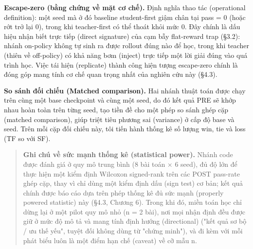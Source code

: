 \textbf{Escape-zero (bằng chứng về mặt cơ chế).} Định nghĩa thao tác (operational definition): một seed mà ở đó baseline student-first giậm chân tại pass = 0 (hoặc rớt trở lại 0), trong khi teacher-first có thể thoát khỏi mức 0. Đây chính là dấu hiệu nhận biết trực tiếp (direct signature) của cạm bẫy flat-reward trap (§3.2): nhánh on-policy không tự sinh ra được rollout đúng nào để học, trong khi teacher (thiên về off-policy) có khả năng bơm (inject) trực tiếp một lời giải đúng vào quá trình học. Việc tái hiện (replicate) thành công hiện tượng escape-zero chính là đóng góp mang tính cơ chế quan trọng nhất của nghiên cứu này (§4.3).

\textbf{So sánh đối chiếu (Matched comparison).} Hai nhánh thuật toán được chạy trên cùng một base checkpoint và cùng một seed, do đó kết quả PRE sẽ khớp nhau hoàn toàn trên từng seed, tạo tiền đề cho một phép so sánh ghép cặp (matched comparison), giúp triệt tiêu phương sai (variance) ở cấp độ base và seed. Trên mỗi cặp đối chiếu này, tôi tiến hành thống kê số lượng win, tie và loss (TF so với SF).

\begin{quote}
\textbf{Ghi chú về sức mạnh thống kê (statistical power).} Nhánh code được đánh giá ở quy mô trung bình (8 bài toán × 6 seed), đủ độ lớn để thực hiện một kiểm định Wilcoxon signed-rank trên các POST pass-rate ghép cặp, thay vì chỉ dùng một kiểm định dấu (sign test) cơ bản; kết quả chính được báo cáo dựa trên phép thống kê đủ sức mạnh (properly powered statistic) này (§4.3, Chương 6). Trong khi đó, miền toán học chỉ dừng lại ở một pilot quy mô nhỏ (n = 2 bài), nơi mọi nhận định đều được giữ ở mức độ mô tả và mang tính định hướng (directional) ("kết quả sơ bộ / ưu thế yếu", tuyệt đối không dùng từ "chứng minh"), và đi kèm với mỗi phát biểu luôn là một điểm hạn chế (caveat) về cỡ mẫu n.
\end{quote}
